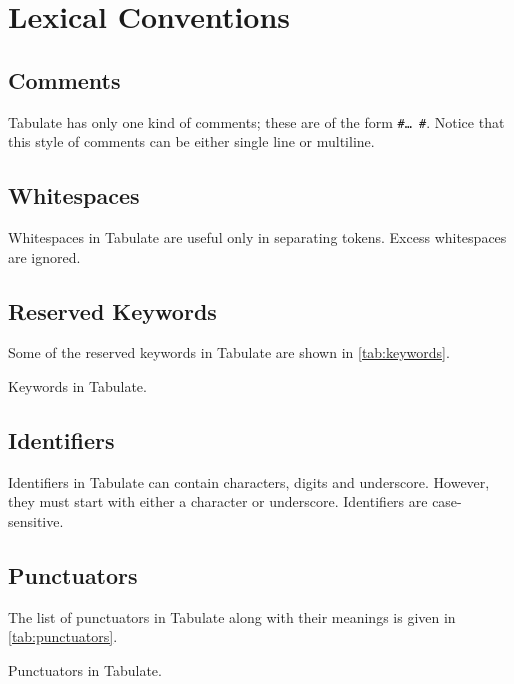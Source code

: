 \documentclass[conference,compsoc]{IEEEtran}
\begin{document}
\section{Lexical Conventions}

\subsection{Comments}
Tabulate has only one kind of comments; these are of the form \texttt{\#\ldots
\#}. Notice that this style of comments can be either single line or multiline.

\subsection{Whitespaces}
Whitespaces in Tabulate are useful only in separating tokens. Excess whitespaces
are ignored.

\subsection{Reserved Keywords}

Some of the reserved keywords in Tabulate are shown in \autoref{tab:keywords}.

\begin{table}[!ht]
  
  \vspace{3mm}
  \caption{Keywords in Tabulate.}
  \label{tab:keywords}
\end{table}

\subsection{Identifiers}
Identifiers in Tabulate can contain characters, digits and underscore. However,
they must start with either a character or underscore. Identifiers are
case-sensitive.

\subsection{Punctuators}

The list of punctuators in Tabulate along with their meanings is given in
\autoref{tab:punctuators}.

\begin{table}[!ht]
  
  \vspace{3mm}
  \caption{Punctuators in Tabulate.}
  \label{tab:punctuators}
\end{table}
\end{document}
